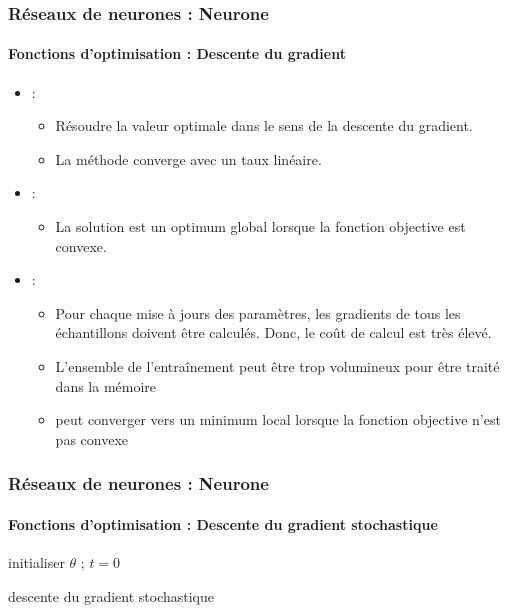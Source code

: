 \documentclass[xcolor=table]{beamer}
\begin{document}
\begin{frame}
\frametitle{Réseaux de neurones : Neurone}
\framesubtitle{Fonctions d'optimisation : Descente du gradient}

\begin{itemize}
	\item {} : 
	\begin{itemize}
		\item Résoudre la valeur optimale dans le sens de la descente du gradient.
		\item La méthode converge avec un taux linéaire.
	\end{itemize}
	\item {} : 
	\begin{itemize}
		\item La solution est un optimum global lorsque la fonction objective est convexe.
	\end{itemize}
	\item {} : 
	\begin{itemize}
		\item Pour chaque mise à jours des paramètres, les gradients de tous les échantillons doivent être calculés. Donc, le coût de calcul est très élevé. 
		\item L'ensemble de l'entraînement peut être trop volumineux pour être traité dans la mémoire
		\item peut converger vers un minimum local lorsque la fonction objective n'est pas convexe
	\end{itemize}
\end{itemize}

\end{frame}

\begin{frame}
\frametitle{Réseaux de neurones : Neurone}
\framesubtitle{Fonctions d'optimisation : Descente du gradient stochastique}

\begin{algorithm}[H]
	\KwResult{$ \theta $}
	initialiser $ \theta $ ; $ t = 0 $\;
	\caption{descente du gradient stochastique}
\end{algorithm}

\end{frame}
\end{document}
